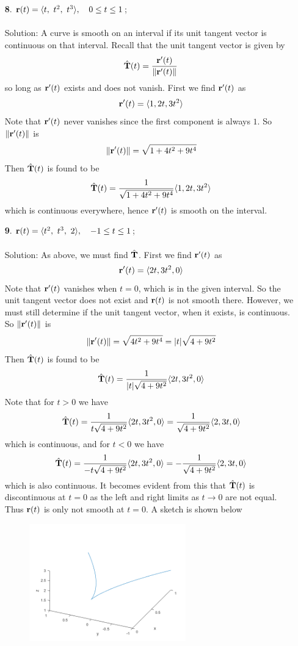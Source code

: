 \documentclass[12pt]{amsbook}
\newcommand{\la}{\langle}
\newcommand{\ra}{\rangle}
\begin{document}
\begin{enumerate}
  \item[{\small\bf 8}.] ${\bf r}(t)=\la t, \ t^2, \ t^3\ra, \ \ \ 0 \leq t \leq 1$;
  \\
  \\
  {\sc Solution}: A curve is smooth on an interval if its unit tangent vector is continuous on that interval. Recall that the unit tangent vector is given by
  $$\hat{\bf T}(t)=\frac{{\bf r}'(t)}{\|{\bf r}'(t)\|}$$
  so long as ${\bf r}'(t)$ exists and does not vanish. First we find ${\bf r}'(t)$ as
  $${\bf r}'(t)=\la 1,2t,3t^2 \ra$$
  Note that ${\bf r}'(t)$ never vanishes since the first component is always $1$. So $\|{\bf r}'(t)\|$ is
  $$\|{\bf r}'(t)\|=\sqrt{1+4t^2+9t^4}$$
  Then $\hat{\bf T}(t)$ is found to be
  $$\hat{\bf T}(t)=\frac{1}{\sqrt{1+4t^2+9t^4}}\la 1,2t,3t^2 \ra$$
  which is continuous everywhere, hence ${\bf r}'(t)$ is smooth on the interval. 
  \\
  \item[{\small\bf 9}.] ${\bf r}(t)=\la t^2, \ t^3, \ 2 \ra, \ \ \ -1 \leq t \leq 1$;
  \\
  \\
  {\sc Solution}: As above, we must find $\hat{\bf T}$. First we find ${\bf r}'(t)$ as
  $${\bf r}'(t)=\la 2t,3t^2,0 \ra$$
  Note that ${\bf r}'(t)$ vanishes when $t=0$, which is in the given interval. So the unit tangent vector does not exist and ${\bf r}(t)$ is not smooth there. However, we must still determine if the unit tangent vector, when it exists, is continuous. So $\|{\bf r}'(t)\|$ is
  $$\|{\bf r}'(t)\|=\sqrt{4t^2+9t^4}=|t|\sqrt{4+9t^2}$$
  Then $\hat{\bf T}(t)$ is found to be
  $$\hat{\bf T}(t)=\frac{1}{|t|\sqrt{4+9t^2}}\la 2t,3t^2,0 \ra$$
  Note that for $t>0$ we have
  $$\hat{\bf T}(t)=\frac{1}{t\sqrt{4+9t^2}}\la 2t,3t^2,0 \ra=\frac{1}{\sqrt{4+9t^2}}\la 2,3t,0 \ra$$
  which is continuous, and for $t<0$ we have
  $$\hat{\bf T}(t)=\frac{1}{-t\sqrt{4+9t^2}}\la 2t,3t^2,0 \ra=-\frac{1}{\sqrt{4+9t^2}}\la 2,3t,0 \ra$$
  which is also continuous. It becomes evident from this that $\hat{\bf T}(t)$ is discontinuous at $t=0$ as the left and right limits as $t \rightarrow 0$ are not equal. Thus ${\bf r}(t)$ is only not smooth at $t=0$. A sketch is shown below
\begin{center}
\includegraphics[width=3.5in,height=2.0in]{2_11_9.png}

\end{center}
\end{enumerate}
\end{document}
